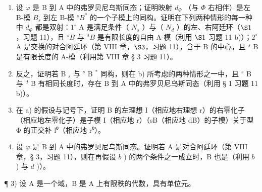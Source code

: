\begin{enumerate}
\def\labelenumi{\alph{enumi})}
\setcounter{enumi}{1}
\item
  设 \(\varphi\) 是 B 到 A 中的弗罗贝尼乌斯同态；证明映射 \(d_{\Phi}\) （与 \(\Phi\) 右相伴）是左 B-模 \(B_s\) 到左 B-模 \(^sB^*\) 的一个子模上的同构。证明在下列两种情形的每一种中 \(d_{\Phi}\) 都是双射：\(1^\circ\) A 是满足条件（ \(N_s\) ）与（ \(N_d\) ）的左、右阿廷环（\(\S 1\)，习题 11），且 \(^sB\) 与 \(^dB\) 是有限长度的自由 A-模（利用 \(\S 1\) 习题 11 b)）；\(2^\circ\) A 是交换的对合阿廷环（第 VIII 章，\(\S 3\)，习题 11），含于 B 的中心，且 \(^{s}\) B 是有限长度的 A-模（利用第 VIII 章 § 3 习题 11）。
\item
  反之，证明若 B \(_{s}\) 与 \(^{s}\) B \(^{*}\) 同构，则在 b) 所考虑的两种情形之一中，且 \(^{s}\) B 与 \(^{d}\) B 有相同长度时，存在 B 到 A 中的弗罗贝尼乌斯同态（利用 § 1 习题 11 b)）。
\item
  在 a) 的假设与记号下，证明 B 的左理想 I（相应地右理想 r）的右零化子（相应地左零化子）是子模 I（相应地 r）（sB（相应地 dB）的子模）关于型 Φ 的正交补 l⁰（相应地 r⁰）。
\item
  设 \(\varphi\) 是 B 到 A 中的弗罗贝尼乌斯同态。证明若 A 是对合阿廷环（第 VIII 章，§ 3，习题 11），则在再假设 \(b\) ) 的两个条件之一成立时，B 也是（利用 \(b\) ) 与 \(d\) )）。
\end{enumerate}

¶ 3) 设 A 是一个域，B 是 A 上有限秩的代数，具有单位元。

